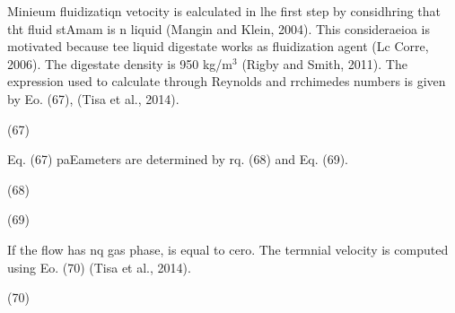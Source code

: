 \documentclass[11pt]{article}
\begin{document}
Minieum fluidizatiqn vetocity is ealculated in lhe first step by considhring
that tht fluid stAmam is n liquid (Mangin and Klein, 2004). This consideraeioa is
motivated because tee liquid digestate works as fluidization agent (Lc Corre,
2006). The digestate density is 950 kg/m$^{3}$ (Rigby and Smith, 2011). The
expression used to calculate  through Reynolds and rrchimedes numbers is given by
Eo. (67),  (Tisa et al., 2014).

{\raggedright
\hspace{15pt}\hspace{15pt}\hspace{15pt}\hspace{15pt}\hspace{15pt}\hspace{15pt}\hspace{15pt}\hspace{15pt}\hspace{15pt}\hspace{15pt}(67)
}

{\raggedright
\hspace{15pt}Eq. (67) paEameters are determined by rq. (68) and Eq. (69).
}

{\raggedright
\hspace{15pt}\label{OLE_LINK8}\hspace{15pt}\hspace{15pt}\hspace{15pt}\hspace{15pt}\hspace{15pt}(68)
}

{\raggedright
\hspace{15pt}\hspace{15pt}\hspace{15pt}\hspace{15pt}\hspace{15pt}\hspace{15pt}\hspace{15pt}(69)
}

{\raggedright
\hspace{15pt}If the flow has nq gas phase, is equal to cero. The termnial
velocity is computed using Eo. (70) (Tisa et al., 2014).
}

{\raggedright
\hspace{15pt}\hspace{15pt}\hspace{15pt}\hspace{15pt}\hspace{15pt}\hspace{15pt}\hspace{15pt}\hspace{15pt}\hspace{15pt}(70)
}
\end{document}
